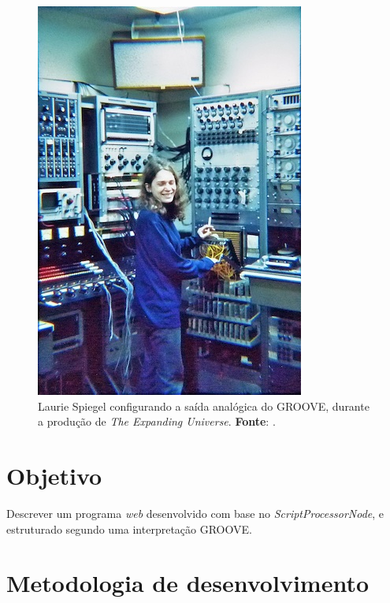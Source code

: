 \begin{figure}[!h]
  \begin{center}
  \includegraphics[scale=0.5]{./spiegel.jpg}
  \caption{Laurie Spiegel configurando a saída analógica do GROOVE, durante a produção de \emph{The Expanding Universe}. \textbf{Fonte}: \cite{spiegel_expanding_1975}.}
  \label{fig:groove}
  \end{center}
\end{figure}

\section{Objetivo}

Descrever um programa \emph{web} desenvolvido com base no \emph{ScriptProcessorNode}, e estruturado segundo uma interpretação GROOVE.


\section{Metodologia de desenvolvimento}

